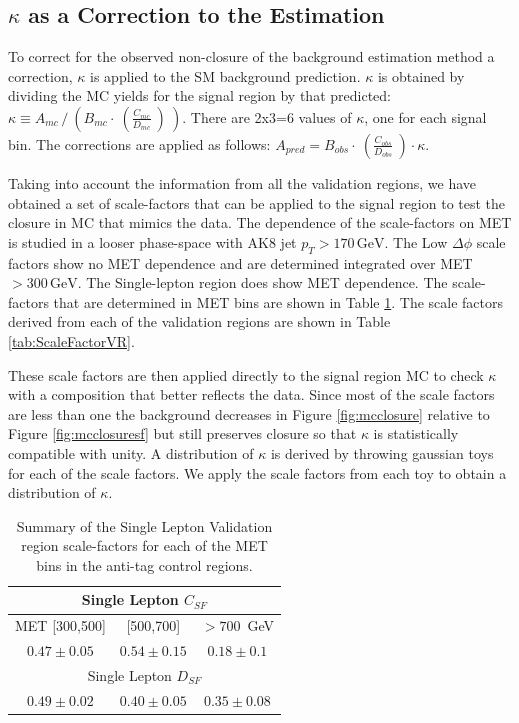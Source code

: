 \subsection{$\kappa$ as a Correction to the Estimation}
\label{sec:kappa}

To correct for the observed non-closure of the background estimation method a correction, $\kappa$ is applied to the SM background prediction. $\kappa$ is obtained by dividing the MC yields for the signal region by that predicted: $\kappa  \equiv A_{mc} \,/  \ (B_{mc} \cdot \ (\frac{ C_{mc}} {D_{mc}}\ ) \ )$. There are 2x3=6 values of $\kappa$, one for each signal bin. The corrections are applied as follows: $A_{pred} = B_{obs} \cdot \ (\frac{ C_{obs}} {D_{obs}}\ ) \cdot \kappa$.

Taking into account the information from all the validation regions, we have obtained a set of scale-factors that can be applied to the signal region to test the closure in MC that mimics the data. The dependence of the scale-factors on MET is studied in a looser phase-space with AK8 jet $p_{T}>170\,\textrm{GeV}$. The Low $\Delta\phi$ scale factors show no MET dependence and are determined integrated over MET$>300\,\textrm{GeV}$. The Single-lepton region does show MET dependence. The scale-factors that are determined in MET bins are shown in Table \ref{tab:ScaleFactorMET}. The scale factors derived from each of the validation regions are shown in Table \ref{tab:ScaleFactorVR}. 

These scale factors are then applied directly to the signal region MC to check $\kappa$ with a composition that better reflects the data. Since most of the scale factors are less than one the background decreases in Figure \ref{fig:mcclosure} relative to Figure \ref{fig:mcclosuresf} but still preserves closure so that $\kappa$ is statistically compatible with unity. A distribution of $\kappa$ is derived by throwing gaussian toys for each of the scale factors. We apply the scale factors from each toy to obtain a distribution of $\kappa$.

\begin{table}[htbp!]
\caption{ Summary of the Single Lepton Validation region scale-factors for each of the MET bins in the anti-tag control regions. }
\centering
\begin{tabular}{|c|c|c|}
\hline \hline
\multicolumn{3}{c}{Single Lepton $C_{SF}$}\\
\hline \hline
MET [300,500] & [500,700] & $>700$~GeV\\
$0.47\pm0.05$ & $0.54\pm0.15$ & $0.18\pm 0.1$ \\  \hline\hline
\multicolumn{3}{c}{Single Lepton $D_{SF}$}\\
\hline \hline
$0.49\pm0.02$ & $0.40\pm0.05$ & $0.35\pm 0.08$ \\  \hline
\hline \hline
\end{tabular}
\label{tab:ScaleFactorMET}
\end{table}

